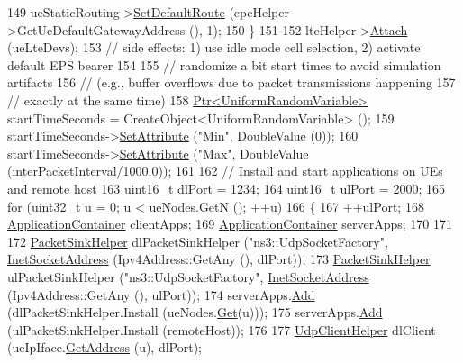 \begin{DoxyCode}
149       ueStaticRouting->\hyperlink{classns3_1_1Ipv4StaticRouting_aee30fa3246c2b42f122dabdff2725331}{SetDefaultRoute} (epcHelper->GetUeDefaultGatewayAddress (), 1);
150     \}
151 
152   lteHelper->\hyperlink{classns3_1_1LteHelper_a9466743f826aa2652a87907b7f0a1c87}{Attach} (ueLteDevs); 
153   \textcolor{comment}{// side effects: 1) use idle mode cell selection, 2) activate default EPS bearer}
154 
155   \textcolor{comment}{// randomize a bit start times to avoid simulation artifacts}
156   \textcolor{comment}{// (e.g., buffer overflows due to packet transmissions happening}
157   \textcolor{comment}{// exactly at the same time) }
158   \hyperlink{classns3_1_1Ptr}{Ptr<UniformRandomVariable>} startTimeSeconds = 
      CreateObject<UniformRandomVariable> ();
159   startTimeSeconds->\hyperlink{classns3_1_1ObjectBase_ac60245d3ea4123bbc9b1d391f1f6592f}{SetAttribute} (\textcolor{stringliteral}{"Min"}, DoubleValue (0));
160   startTimeSeconds->\hyperlink{classns3_1_1ObjectBase_ac60245d3ea4123bbc9b1d391f1f6592f}{SetAttribute} (\textcolor{stringliteral}{"Max"}, DoubleValue (interPacketInterval/1000.0));
161 
162   \textcolor{comment}{// Install and start applications on UEs and remote host}
163   uint16\_t dlPort = 1234;
164   uint16\_t ulPort = 2000;
165   \textcolor{keywordflow}{for} (uint32\_t u = 0; u < ueNodes.\hyperlink{classns3_1_1NodeContainer_aed647ac56d0407a7706aba02eb44b951}{GetN} (); ++u)
166     \{
167       ++ulPort;
168       \hyperlink{classns3_1_1ApplicationContainer}{ApplicationContainer} clientApps;
169       \hyperlink{classns3_1_1ApplicationContainer}{ApplicationContainer} serverApps;
170 
171 
172       \hyperlink{classns3_1_1PacketSinkHelper}{PacketSinkHelper} dlPacketSinkHelper (\textcolor{stringliteral}{"ns3::UdpSocketFactory"}, 
      \hyperlink{classns3_1_1InetSocketAddress}{InetSocketAddress} (Ipv4Address::GetAny (), dlPort));
173       \hyperlink{classns3_1_1PacketSinkHelper}{PacketSinkHelper} ulPacketSinkHelper (\textcolor{stringliteral}{"ns3::UdpSocketFactory"}, 
      \hyperlink{classns3_1_1InetSocketAddress}{InetSocketAddress} (Ipv4Address::GetAny (), ulPort));
174       serverApps.\hyperlink{classns3_1_1ApplicationContainer_ad09ab1a1ad5849d518d5f4c262e38152}{Add} (dlPacketSinkHelper.Install (ueNodes.\hyperlink{classns3_1_1NodeContainer_a9ed96e2ecc22e0f5a3d4842eb9bf90bf}{Get}(u)));
175       serverApps.\hyperlink{classns3_1_1ApplicationContainer_ad09ab1a1ad5849d518d5f4c262e38152}{Add} (ulPacketSinkHelper.Install (remoteHost));
176 
177       \hyperlink{classns3_1_1UdpClientHelper}{UdpClientHelper} dlClient (ueIpIface.\hyperlink{classns3_1_1Ipv4InterfaceContainer_ae63208dcd222be986822937ee4aa828c}{GetAddress} (u), dlPort);

\end{DoxyCode}
